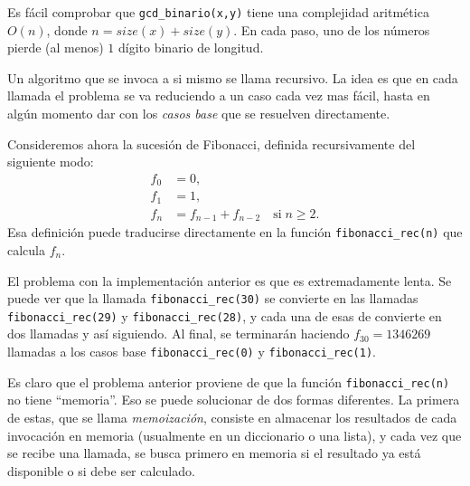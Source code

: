 \documentclass[a4paper, 11pt]{article}
\theoremstyle{plain}
\theoremstyle{definition}
\begin{document}
\bigskip



\bigskip

Es fácil comprobar que \texttt{gcd\_binario(x,y)} tiene una complejidad aritmética
$O(n)$, donde $n=size(x)+size(y)$. En cada paso, uno de los números pierde (al menos)
$1$ dígito binario de longitud.

\bigskip

Un algoritmo que se invoca a si mismo se llama recursivo. La idea es que en
cada llamada el problema se va reduciendo a un caso cada vez mas fácil, hasta
en algún momento dar con los \emph{casos base} que se resuelven directamente.

\bigskip

Consideremos ahora la sucesión de Fibonacci, definida recursivamente del
siguiente modo:
\[
\begin{aligned}
   f_0 &= 0, \\
   f_1 &= 1, \\
   f_n &= f_{n-1} + f_{n-2}\quad\text{si}\;n\geq 2.
\end{aligned}
\]
Esa definición puede traducirse directamente en la función \texttt{fibonacci\_rec(n)}
que calcula $f_n$.

\bigskip



\bigskip

El problema con la implementación anterior es que es extremadamente lenta. Se
puede ver que la llamada \texttt{fibonacci\_rec(30)} se convierte en las llamadas
\texttt{fibonacci\_rec(29)} y \texttt{fibonacci\_rec(28)}, y cada una de esas de
convierte en dos llamadas y así siguiendo. Al final, se terminarán haciendo
$f_{30}=1346269$ llamadas a los casos base \texttt{fibonacci\_rec(0)} y
\texttt{fibonacci\_rec(1)}.

\bigskip

Es claro que el problema anterior proviene de que la función \texttt{fibonacci\_rec(n)}
no tiene ``memoria''. Eso se puede solucionar de dos formas diferentes. La primera
de estas, que se llama \emph{memoización}, consiste en almacenar los resultados
de cada invocación en memoria (usualmente en un diccionario o una lista), y
cada vez que se recibe una llamada, se busca primero en memoria si el resultado
ya está disponible o si debe ser calculado.
\end{document}
